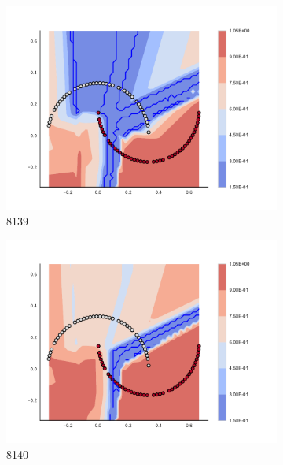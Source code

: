 \begin{figure}[h]
\begin{subfigure}[b]{0.09\textwidth}
    \includegraphics[clip, trim=2.35cm 1.75cm 4.5cm 0cm,width=\textwidth]{img/convergence/8139.pdf}
    \caption{8139}
    \label{fig:convergence_8139}
\end{subfigure}
%
\begin{subfigure}[b]{0.09\textwidth}
    \includegraphics[clip, trim=2.35cm 1.75cm 4.5cm 0cm,width=\textwidth]{img/convergence/8140.pdf}
    \caption{8140}
    \label{fig:convergence_8140}
\end{subfigure}
%
\begin{subfigure}[b]{0.09\textwidth}

\end{subfigure}
\end{figure}
